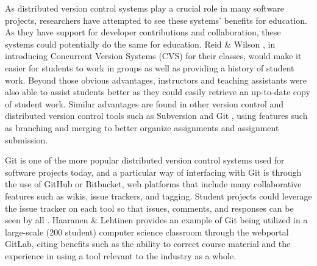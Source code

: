As distributed version control systems play a crucial role in many software projects, researchers have attempted to see these systems’ benefits for education. As they have support for developer contributions and collaboration, these systems could potentially do the same for education. Reid \& Wilson \cite{reid2005learning}, in introducing Concurrent Version Systems (CVS) for their classes, would make it easier for students to work in groups as well as providing a history of student work. Beyond those obvious advantages, instructors and teaching assistants were also able to assist students better as they could easily retrieve an up-to-date copy of student work. Similar advantages are found in other version control and distributed version control tools such as Subversion \cite{clifton2007subverting} and Git \cite{griffin2013github}, using features such as branching and merging to better organize assignments and assignment submission.

Git is one of the more popular distributed version control systems used for software projects today, and a particular way of interfacing with Git is through the use of GitHub or Bitbucket, web platforms that include many collaborative features such as wikis, issue trackers, and tagging. Student projects could leverage the issue tracker on each tool so that issues, comments, and responses can be seen by all \cite{kelleher2014employing}. Haaranen & Lehtinen \cite{haaranen2015teaching} provides an example of Git being utilized in a large-scale (200 student) computer science classroom through the webportal GitLab, citing benefits such as the ability to correct course material and the experience in using a tool relevant to the industry as a whole.





